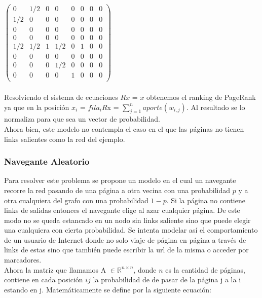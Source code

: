 $ \begin{pmatrix}
  0 & 1/2 & 0 & 0 & 0 & 0 & 0 & 0 \\
 1/2 & 0 & 0 & 0 & 0 & 0 & 0 & 0  \\
  0 & 0 & 0 & 0 & 0 & 0 & 0 & 0  \\
   0 & 0 & 0 & 0 & 0 & 0 & 0 & 0  \\
    1/2 & 1/2 & 1 & 1/2 & 0 & 1 & 0 & 0  \\
     0 & 0 & 0 & 0 & 0 & 0 & 0 & 0  \\
      0 & 0 & 0 & 1/2 & 0 & 0 & 0 & 0  \\
       0 & 0 & 0 & 0 & 1 & 0 & 0 & 0  \\
 \end{pmatrix}$ \\ \\


Resolviendo el sistema de ecuaciones $Rx$ = $x$ obtenemos el ranking de PageRank ya que en la posición $x_{i}$ = $fila_{i} R$x = $\sum_{j=1}^{n} aporte (w_{i,j})$. Al resultado se lo normaliza para que sea un vector de probabilidad. \\

Ahora bien, este modelo no contempla el caso en el que las páginas no tienen links salientes como la red del ejemplo. 

\subsubsection{Navegante Aleatorio}

Para resolver este problema se propone un modelo en el cual un navegante recorre la red pasando de una página a otra vecina con una probabilidad $p$ y a otra cualquiera del grafo con una probabilidad $1-p$. Si la página no contiene links de salidas entonces el navegante elige al azar cualquier página. De este modo no se queda estancado en un nodo sin links saliente sino que puede elegir una cualquiera con cierta probabilidad. Se intenta modelar así el comportamiento de un usuario de Internet donde no solo viaje de página en página a través de links de estas sino que también puede escribir la url de la misma o acceder por marcadores. \\

Ahora la matriz que llamamos A $\in \mathbb{R}^{n \times n}$, donde $n$ es la cantidad de páginas, contiene en cada posición $ij$ la probabilidad de de pasar de la página j a la i estando en j. Matemáticamente se define por la siguiente ecuación:


